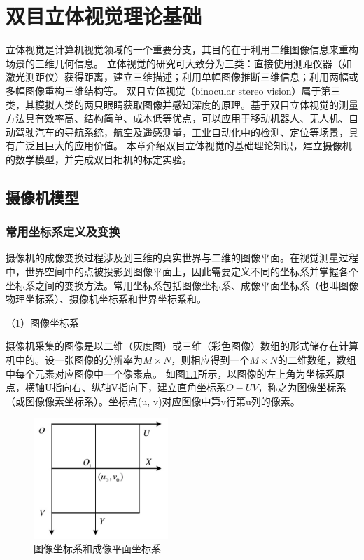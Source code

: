 
\chapter{双目立体视觉理论基础}
立体视觉是计算机视觉领域的一个重要分支，其目的在于利用二维图像信息来重构场景的三维几何信息。
立体视觉的研究可大致分为三类：直接使用测距仪器（如激光测距仪）获得距离，建立三维描述；利用单幅图像推断三维信息；利用两幅或多幅图像重构三维结构等。
双目立体视觉（binocular stereo vision）属于第三类，其模拟人类的两只眼睛获取图像并感知深度的原理。基于双目立体视觉的测量方法具有效率高、结构简单、成本低等优点，可以应用于移动机器人、无人机、自动驾驶汽车的导航系统，航空及遥感测量，工业自动化中的检测、定位等场景，具有广泛且巨大的应用价值。
本章介绍双目立体视觉的基础理论知识，建立摄像机的数学模型，并完成双目相机的标定实验。

\section{摄像机模型}
\subsection{常用坐标系定义及变换}
摄像机的成像变换过程涉及到三维的真实世界与二维的图像平面。在视觉测量过程中，世界空间中的点被投影到图像平面上，因此需要定义不同的坐标系并掌握各个坐标系之间的变换方法。常用坐标系包括图像坐标系、成像平面坐标系（也叫图像物理坐标系）、摄像机坐标系和世界坐标系和。

（1）图像坐标系

摄像机采集的图像是以二维（灰度图）或三维（彩色图像）数组的形式储存在计算机中的。设一张图像的分辨率为$M\times N$，则相应得到一个$M\times N$的二维数组，数组中每个元素对应图像中一个像素点。 如图\ref{fig:2_1_image_coord}所示，以图像的左上角为坐标系原点，横轴U指向右、纵轴V指向下，建立直角坐标系$O-UV$，称之为图像坐标系（或图像像素坐标系）。坐标点(u, v)对应图像中第v行第u列的像素。

\begin{figure}[!htb] %
	\centering
	\includegraphics[width=2in]{figures/2_1_image_coord}
	\caption{图像坐标系和成像平面坐标系}\label{fig:2_1_image_coord}
\end{figure}

